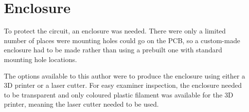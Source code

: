 \section{Enclosure}

To protect the circuit, an enclosure was needed. There were only a limited
number of places were mounting holes could go on the PCB, so a custom-made
enclosure had to be made rather than using a prebuilt one with standard mounting
hole locations.

The options available to this author were to produce the enclosure using either
a 3D printer or a laser cutter. For easy examiner inspection, the enclosure
needed to be transparent and only coloured plastic filament was available for
the 3D printer, meaning the laser cutter needed to be used.


